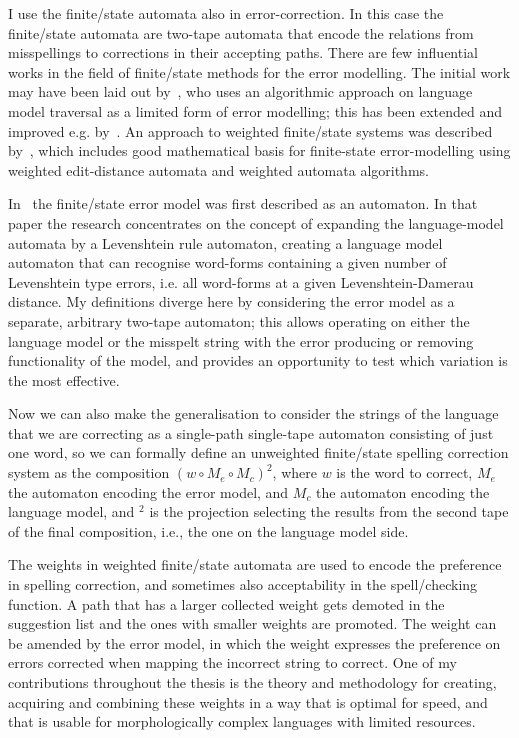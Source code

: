 \documentclass[officiallayout]{unihelcompling}
\begin{document}
I use the finite\-/state automata also in error-correction. In this case the
finite\-/state automata are two-tape automata that encode the relations from
misspellings to corrections in their accepting paths. There are few influential
works in the field of finite\-/state methods for the error modelling. The
initial work may have been laid out by~\citet{oflazer1996errortolerant}, who
uses an algorithmic approach on language model traversal as a limited form of
error modelling; this has been extended and improved e.g.
by~\citet{hulden2009fast}.  An approach to weighted finite\-/state systems was
described by~\citet{mohri2003edit}, which includes good mathematical basis for
finite-state error-modelling using weighted edit-distance automata and weighted
automata algorithms. 

In~\citet{agata2002typographical} the finite\-/state error model was first
described as an automaton. In that paper the research concentrates on the
concept of expanding the language-model automata by a Levenshtein rule
automaton, creating a language model automaton that can recognise word-forms
containing a given number of Levenshtein type errors, i.e. all word-forms at a
given Levenshtein-Damerau distance. My definitions diverge here by considering
the error model as a separate, arbitrary two-tape automaton; this allows
operating on either the language model or the misspelt string with the error
producing or removing functionality of the model, and provides an opportunity
to test which variation is the most effective. 

Now we can also make the generalisation to consider the strings of the language
that we are correcting as a single-path single-tape automaton consisting of
just one word, so we can formally define an unweighted finite\-/state spelling
correction system as the composition $(w \circ M_e \circ M_c)^2$, where $w$ is
the word to correct, $M_e$ the automaton encoding the error model, and $M_c$
the automaton encoding the language model, and $^2$ is the projection selecting
the results from the second tape of the final composition, i.e., the one on the
language model side.

The weights in weighted finite\-/state automata are used to encode the preference
in spelling correction, and sometimes also acceptability in the
spell\-/checking function. A path that has a larger collected weight gets
demoted in the suggestion list and the ones with smaller weights are promoted.
The weight can be amended by the error model, in which the weight expresses the
preference on errors corrected when mapping the incorrect string to correct.
One of my contributions throughout the thesis is the theory and methodology for
creating, acquiring and combining these weights in a way that is optimal for
speed, and that is usable for morphologically complex languages with limited
resources.
\end{document}
